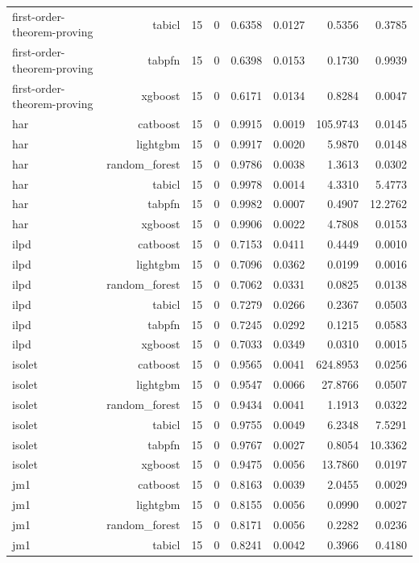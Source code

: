 \begin{table}[htbp]
\begin{tabular}{lrrrrrrr}
first-order-theorem-proving & tabicl & 15 & 0 & 0.6358 & 0.0127 & 0.5356 & 0.3785 \\
first-order-theorem-proving & tabpfn & 15 & 0 & 0.6398 & 0.0153 & 0.1730 & 0.9939 \\
first-order-theorem-proving & xgboost & 15 & 0 & 0.6171 & 0.0134 & 0.8284 & 0.0047 \\
har & catboost & 15 & 0 & 0.9915 & 0.0019 & 105.9743 & 0.0145 \\
har & lightgbm & 15 & 0 & 0.9917 & 0.0020 & 5.9870 & 0.0148 \\
har & random\_forest & 15 & 0 & 0.9786 & 0.0038 & 1.3613 & 0.0302 \\
har & tabicl & 15 & 0 & 0.9978 & 0.0014 & 4.3310 & 5.4773 \\
har & tabpfn & 15 & 0 & 0.9982 & 0.0007 & 0.4907 & 12.2762 \\
har & xgboost & 15 & 0 & 0.9906 & 0.0022 & 4.7808 & 0.0153 \\
ilpd & catboost & 15 & 0 & 0.7153 & 0.0411 & 0.4449 & 0.0010 \\
ilpd & lightgbm & 15 & 0 & 0.7096 & 0.0362 & 0.0199 & 0.0016 \\
ilpd & random\_forest & 15 & 0 & 0.7062 & 0.0331 & 0.0825 & 0.0138 \\
ilpd & tabicl & 15 & 0 & 0.7279 & 0.0266 & 0.2367 & 0.0503 \\
ilpd & tabpfn & 15 & 0 & 0.7245 & 0.0292 & 0.1215 & 0.0583 \\
ilpd & xgboost & 15 & 0 & 0.7033 & 0.0349 & 0.0310 & 0.0015 \\
isolet & catboost & 15 & 0 & 0.9565 & 0.0041 & 624.8953 & 0.0256 \\
isolet & lightgbm & 15 & 0 & 0.9547 & 0.0066 & 27.8766 & 0.0507 \\
isolet & random\_forest & 15 & 0 & 0.9434 & 0.0041 & 1.1913 & 0.0322 \\
isolet & tabicl & 15 & 0 & 0.9755 & 0.0049 & 6.2348 & 7.5291 \\
isolet & tabpfn & 15 & 0 & 0.9767 & 0.0027 & 0.8054 & 10.3362 \\
isolet & xgboost & 15 & 0 & 0.9475 & 0.0056 & 13.7860 & 0.0197 \\
jm1 & catboost & 15 & 0 & 0.8163 & 0.0039 & 2.0455 & 0.0029 \\
jm1 & lightgbm & 15 & 0 & 0.8155 & 0.0056 & 0.0990 & 0.0027 \\
jm1 & random\_forest & 15 & 0 & 0.8171 & 0.0056 & 0.2282 & 0.0236 \\
jm1 & tabicl & 15 & 0 & 0.8241 & 0.0042 & 0.3966 & 0.4180 \\

\end{tabular}
\end{table}

